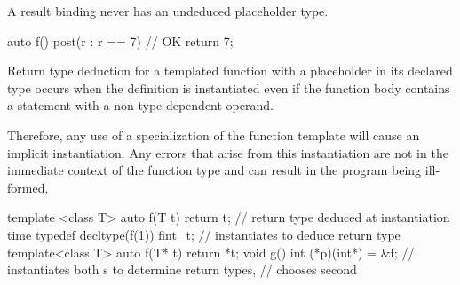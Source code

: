 \pnum
A result binding never has
an undeduced placeholder type.
\begin{example}
\begin{codeblock}
auto f()
  post(r : r == 7)  // OK
{
  return 7;
}
\end{codeblock}
\end{example}


\pnum
Return type deduction for a templated
function with a placeholder in its
declared type occurs when the definition is instantiated even if the function
body contains a  statement with a non-type-dependent operand.
\begin{note}
Therefore, any use of a specialization of the function template will
cause an implicit instantiation. Any errors that arise from this instantiation
are not in the immediate context of the function type and can result in the
program being ill-formed.
\end{note}
\begin{example}
\begin{codeblock}
template <class T> auto f(T t) { return t; }    // return type deduced at instantiation time
typedef decltype(f(1)) fint_t;                  // instantiates  to deduce return type
template<class T> auto f(T* t) { return *t; }
void g() { int (*p)(int*) = &f; }               // instantiates both s to determine return types,
                                                // chooses second
\end{codeblock}
\end{example}

